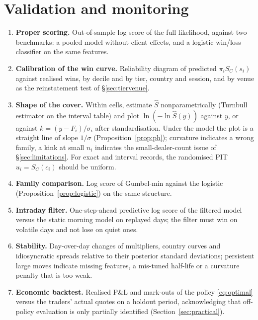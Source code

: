 \documentclass[11pt,a4paper]{article}
\theoremstyle{definition}
\theoremstyle{remark}
\begin{document}
\section{Validation and monitoring}\label{sec:validation}

\begin{enumerate}[itemsep=2pt]
\item \textbf{Proper scoring.} Out-of-sample log score of the full likelihood, against two benchmarks: a pooled model without client effects, and a logistic win/loss classifier on the same features.
\item \textbf{Calibration of the win curve.} Reliability diagram of predicted $\pi_iS_C(s_i)$ against realised wins, by decile and by tier, country and session, and by venue as the reinstatement test of \S\ref{sec:tiervenue}.
\item \textbf{Shape of the cover.} Within cells, estimate $\hat S$ nonparametrically (Turnbull estimator on the interval table) and plot $\ln(-\ln\hat S(y))$ against $y$, or against $k=(y-F_i)/\sigma_i$ after standardisation. Under the model the plot is a straight line of slope $1/\sigma$ (Proposition~\ref{prop:ph}); curvature indicates a wrong family, a kink at small $n_i$ indicates the small-dealer-count issue of \S\ref{sec:limitations}. For exact and interval records, the randomised PIT $u_i=S_C(c_i)$ should be uniform.
\item \textbf{Family comparison.} Log score of Gumbel-min against the logistic (Proposition~\ref{prop:logistic}) on the same structure.
\item \textbf{Intraday filter.} One-step-ahead predictive log score of the filtered model versus the static morning model on replayed days; the filter must win on volatile days and not lose on quiet ones.
\item \textbf{Stability.} Day-over-day changes of multipliers, country curves and idiosyncratic spreads relative to their posterior standard deviations; persistent large moves indicate missing features, a mis-tuned half-life or a curvature penalty that is too weak.
\item \textbf{Economic backtest.} Realised P\&L and mark-outs of the policy \eqref{eq:optimal} versus the traders' actual quotes on a holdout period, acknowledging that off-policy evaluation is only partially identified (Section~\ref{sec:practical}).
\end{enumerate}
\end{document}
